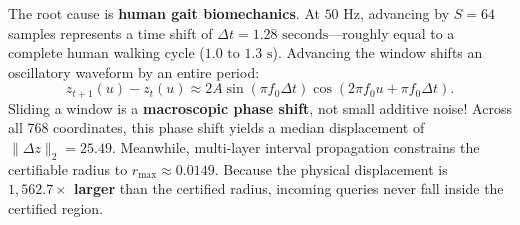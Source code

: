 \documentclass[journal,onecolumn,10pt]{IEEEtran}
\theoremstyle{remark}
\begin{document}
\begin{table}[!htbp]
\centering\small
\caption{Quantitative Disparity Between Real Streaming Sensor Displacement and Maximum Certified Radii.}
\label{tab:noise_gap}
\end{table}

The root cause is \textbf{human gait biomechanics}. At $50\text{ Hz}$, advancing by $S = 64$ samples represents a time shift of $\Delta t = 1.28\text{ seconds}$---roughly equal to a complete human walking cycle ($1.0\text{ to }1.3\text{ s}$). Advancing the window shifts an oscillatory waveform by an entire period:
\begin{equation}
z_{t+1}(u) - z_t(u) \approx 2 A \sin(\pi f_0 \Delta t) \cos(2\pi f_0 u + \pi f_0 \Delta t).
\end{equation}
Sliding a window is a \textbf{macroscopic phase shift}, not small additive noise! Across all 768 coordinates, this phase shift yields a median displacement of $\|\Delta z\|_2 = 25.49$. Meanwhile, multi-layer interval propagation constrains the certifiable radius to $r_{\max} \approx 0.0149$. Because the physical displacement is \textbf{$1,562.7\times$ larger} than the certified radius, incoming queries never fall inside the certified region.
\end{document}
